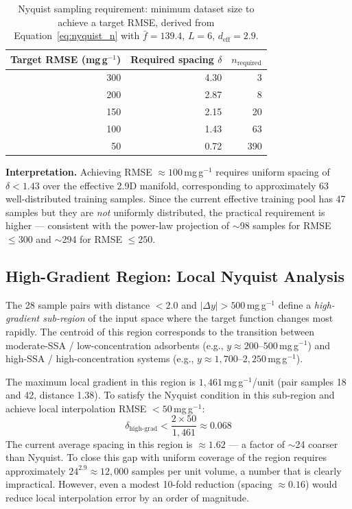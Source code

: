 \documentclass[12pt,a4paper]{article}
\begin{document}
\begin{table}[h]
\centering
\caption{Nyquist sampling requirement: minimum dataset size to achieve a
  target RMSE, derived from Equation~\eqref{eq:nyquist_n} with
  $\bar{f}=139.4$, $L=6$, $d_{\text{eff}}=2.9$.}
\label{tab:nyquist_req}
\begin{tabular}{rrr}
\toprule
Target RMSE (mg\,g$^{-1}$) & Required spacing $\delta$ & $n_\text{required}$ \\
\midrule
300 & 4.30 & 3 \\
200 & 2.87 & 8 \\
150 & 2.15 & 20 \\
100 & 1.43 & 63 \\
50  & 0.72 & 390 \\
\bottomrule
\end{tabular}
\end{table}

\noindent\textbf{Interpretation.}  Achieving RMSE $\approx 100$\,mg\,g$^{-1}$
requires uniform spacing of $\delta < 1.43$ over the effective 2.9D
manifold, corresponding to approximately 63 well-distributed training
samples.  Since the current effective training pool has 47 samples but
they are \emph{not} uniformly distributed, the practical requirement is
higher — consistent with the power-law projection of $\sim$98 samples for
RMSE $\leq 300$ and $\sim$294 for RMSE $\leq 250$.

\subsection{High-Gradient Region: Local Nyquist Analysis}

The 28 sample pairs with distance $< 2.0$ and $|\Delta y| > 500$\,mg\,g$^{-1}$
define a \emph{high-gradient sub-region} of the input space where the
target function changes most rapidly.  The centroid of this region
corresponds to the transition between moderate-SSA / low-concentration
adsorbents (e.g., $y \approx 200$--$500$\,mg\,g$^{-1}$) and high-SSA /
high-concentration systems (e.g., $y \approx 1{,}700$--$2{,}250$\,mg\,g$^{-1}$).

The maximum local gradient in this region is $1{,}461$\,mg\,g$^{-1}$/unit
(pair samples 18 and 42, distance 1.38).  To satisfy the Nyquist condition
in this sub-region and achieve local interpolation RMSE $< 50$\,mg\,g$^{-1}$:
\begin{equation}
  \delta_{\text{high-grad}} < \frac{2 \times 50}{1{,}461} \approx 0.068
\end{equation}
The current average spacing in this region is $\approx 1.62$ — a factor
of $\sim$24 coarser than Nyquist.  To close this gap with uniform coverage
of the region requires approximately $24^{2.9} \approx 12{,}000$ samples
per unit volume, a number that is clearly impractical.  However, even a
modest 10-fold reduction (spacing $\approx 0.16$) would reduce local
interpolation error by an order of magnitude.
\end{document}
